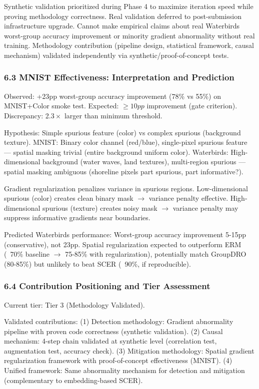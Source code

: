 Synthetic validation prioritized during Phase 4 to maximize iteration speed while proving methodology correctness. Real validation deferred to post-submission infrastructure upgrade. Cannot make empirical claims about real Waterbirds worst-group accuracy improvement or minority gradient abnormality without real training. Methodology contribution (pipeline design, statistical framework, causal mechanism) validated independently via synthetic/proof-of-concept tests.

\subsubsection{6.3 MNIST Effectiveness: Interpretation and Prediction}

Observed: +23pp worst-group accuracy improvement (78\% vs 55\%) on MNIST+Color smoke test. Expected: $\geq 10pp$ improvement (gate criterion). Discrepancy: 2.$3\times$ larger than minimum threshold.

Hypothesis: Simple spurious feature (color) vs complex spurious (background texture). MNIST: Binary color channel (red/blue), single-pixel spurious feature --- spatial masking trivial (entire background uniform color). Waterbirds: High-dimensional background (water waves, land textures), multi-region spurious --- spatial masking ambiguous (shoreline pixels part spurious, part informative?).

Gradient regularization penalizes variance in spurious regions. Low-dimensional spurious (color) creates clean binary mask $\rightarrow$ variance penalty effective. High-dimensional spurious (texture) creates noisy mask $\rightarrow$ variance penalty may suppress informative gradients near boundaries.

Predicted Waterbirds performance: Worst-group accuracy improvement 5-15pp (conservative), not 23pp. Spatial regularization expected to outperform ERM (~70\% baseline $\rightarrow$ 75-85\% with regularization), potentially match GroupDRO (80-85\%) but unlikely to beat SCER (~90\%, if reproducible).

\subsubsection{6.4 Contribution Positioning and Tier Assessment}

Current tier: Tier 3 (Methodology Validated).

Validated contributions: (1) Detection methodology: Gradient abnormality pipeline with proven code correctness (synthetic validation). (2) Causal mechanism: 4-step chain validated at synthetic level (correlation test, augmentation test, accuracy check). (3) Mitigation methodology: Spatial gradient regularization framework with proof-of-concept effectiveness (MNIST). (4) Unified framework: Same abnormality mechanism for detection and mitigation (complementary to embedding-based SCER).

